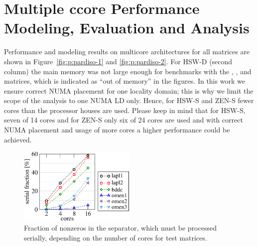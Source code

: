 
\section{Multiple ccore Performance Modeling, Evaluation and Analysis}
\label{sec:performance:multicore}

Performance and modeling results on multicore architectures for all matrices are shown in Figure~\ref{fig:p:pardiso-1} and \ref{fig:p:pardiso-2}.
For HSW-D (second column) the main memory was not large enough for benchmarks
with the , , and  matrices, which is
indicated as ``out of memory'' in the figures.
%
%
In this work we ensure correct NUMA placement for one locality domain; this is why
we limit the scope of the analysis to one NUMA LD only. 
Hence, for HSW-S and ZEN-S fewer cores than the processor houses are used.
Please keep in mind that for HSW-S, seven of 14 cores and for ZEN-S only six of
24 cores are used and with correct NUMA placement and usage of more cores a
higher performance could be achieved.

\begin{figure}[t]%
  \centering%
  \includegraphics[width=0.5\textwidth,clip=true]{images/matrices-serial-fraction}%
  \caption{Fraction of nonzeros in the separator, which must be processed
   serially, depending on the number of cores for test matrices.  }%
  \label{fig:p:serial-fraciton}%
\end{figure}


